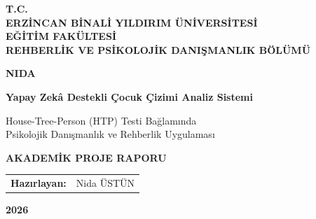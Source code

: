 
\begin{titlepage}
  \centering
  \vspace*{1cm}

  \Large
  \textbf{T.C.} \\
  \textbf{ERZİNCAN BİNALİ YILDIRIM ÜNİVERSİTESİ} \\
  \textbf{EĞİTİM FAKÜLTESİ} \\
  \textbf{REHBERLİK VE PSİKOLOJİK DANIŞMANLIK BÖLÜMÜ}

  \vspace{2cm}

  \Huge
  \textbf{NIDA}

  \Large
  \textbf{Yapay Zekâ Destekli Çocuk Çizimi Analiz Sistemi}

  \vspace{0.5cm}

  \large
  House-Tree-Person (HTP) Testi Bağlamında \\
  Psikolojik Danışmanlık ve Rehberlik Uygulaması

  \vspace{2cm}

  \textbf{AKADEMİK PROJE RAPORU}

  \vspace{2cm}

  \begin{tabular}{rl}
    \textbf{Hazırlayan:} & Nida ÜSTÜN \\
  \end{tabular}

  \vfill

  \textbf{2026}
\end{titlepage}
